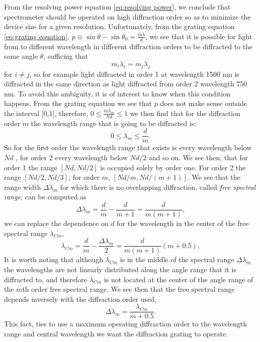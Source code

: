 \documentclass[12pt,twoside,english]{book}
\renewcommand{\~}{\perispomeni}%
\numberwithin{equation}{section}
\numberwithin{figure}{section}
\begin{document}
From the resolving power equation \ref{eq:resolving power}, we conclude that spectrometer should be operated on high diffraction order so as to minimize the device size for a given resolution. Unfortunately, from the grating equation \ref{eq:grating equation}, $p\equiv\sin\theta-\sin\theta_{0}=\frac{m\lambda}{d}$, we see that it is possible for light from to different wavelength in different diffraction orders to be diffracted to the same angle $\theta$, sufficing that 
\begin{equation}
m_{i}\lambda_{i}=m_{j}\lambda_{j}
\end{equation}
for $i\neq j$, so for example light diffracted in order 1 at wavelength 1500 nm is diffracted in the same direction as light diffracted from order 2 wavelength 750 nm. To avoid this ambiguity, it is of interest to know when this condition happens. From the grating equation we see that $p$ does not make sense outside the interval {[}0,1{]}, therefore, $0\le\frac{m\lambda_{m}}{Nd}\le1$ we then find that for the diffraction order $m$ the wavelength range that is going to be diffracted is:
\begin{equation}
0\le\lambda_{m}\le\frac{d}{m}.
\end{equation}
So for the first order the wavelength range that exists is every wavelength below $Nd$ , for order 2 every wavelength below $Nd/2$ and so on. We see then, that for order 1 the range $[Nd,Nd/2]$ is occupied solely by order one. For order 2 the range $[Nd/2,Nd/3]$, for order $m$, $[Nd/m,Nd/(m+1)]$. We see that the range width $\Delta\lambda_{m}$ for which there is no overlapping diffraction, called \emph{free spectral range}, can be computed as
\begin{equation} 
\Delta\lambda_{m}=\frac{d}{m}-\frac{d}{m+1}=\frac{d}{m(m+1)},
\end{equation}
we can replace the dependence on $d$ for the wavelength in the center of the free spectral range $\lambda_{Cm}$,
\begin{equation}
\lambda_{Cm}=\frac{d}{m}-\frac{\Delta\lambda_{m}}{2}=\frac{d}{m(m+1)}(m+0.5),
\end{equation}
It is worth noting that although $\lambda_{Cm}$ is in the middle of the spectral range $\Delta\lambda_{m}$ the wavelengths are not linearly distributed along the angle range that it is diffracted to, and therefore $\lambda_{Cm}$ is not located at the center of the angle range of the $m$th order free spectral range. We see then that the free spectral range depends inversely with the diffraction order used,
\begin{equation}
\Delta\lambda_{m}=\frac{\lambda_{Cm}}{m+0.5}.
\label{eq:FSR}
\end{equation}
This fact, ties to use a maximum operating diffraction order to the wavelength range and central wavelength we want the diffraction grating to operate.
\end{document}
